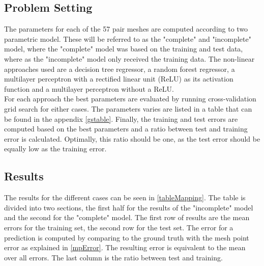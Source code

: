 \subsection{Problem Setting}
The parameters for each of the 57 pair meshes are computed according to two parametric model. These will be referred to as the "complete" and "incomplete" model, where the "complete" model was based on the training and test data, where as the "incomplete" model only received the training data. The non-linear approaches used are a decision tree regressor, a random forest regressor, a multilayer perceptron with a rectified linear unit (ReLU) as its activation function and a multilayer perceptron without a ReLU. \\
For each approach the best parameters are evaluated by running cross-validation grid search for either cases. The parameters varies are listed in a table that can be found in the appendix \ref{gstable}.
Finally, the training and test errors are computed based on the best parameters and a ratio between test and training error is calculated. Optimally, this ratio should be one, as the test error should be equally low as the training error.

\subsection{Results}
The results for the different cases can be seen in \ref{tableMapping}. The table is divided into two sections, the first half for the results of the "incomplete" model and the second for the "complete" model. The first row of results are the mean errors for the training set, the second row for the test set. The error for a prediction is computed by comparing to the ground truth with the mesh point error as explained in \ref{mpError}. The resulting error is equivalent to the mean over all errors. The last column is the ratio between test and training.

